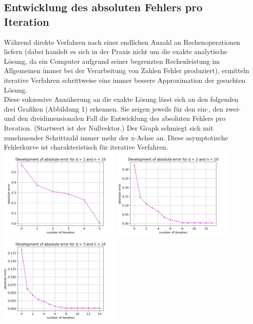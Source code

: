 \documentclass{scrartcl}
\begin{document}
\subsection{Entwicklung des absoluten Fehlers pro Iteration}
Während direkte Verfahren nach einer endlichen Anzahl an Rechenoperationen \grqq{} liefern (dabei handelt es sich in der Praxis nicht um die exakte analytische Lösung, da ein Computer aufgrund seiner begrenzten Rechenleistung im Allgemeinen immer bei der Verarbeitung von Zahlen Fehler produziert), ermitteln iterative Verfahren schrittweise eine immer bessere Approximation der gesuchten Lösung. \\
Diese sukzessive Annäherung an die exakte Lösung lässt sich an den folgenden drei Grafiken (Abbildung 1) erkennen.
Sie zeigen jeweils für den ein-, den zwei- und den dreidimensionalen Fall die Entwicklung des absoluten Fehlers pro Iteration.
(Startwert ist der Nullvektor.)
Der Graph schmiegt sich mit zunehmender Schrittzahl immer mehr der x-Achse an.
Diese asymptotische Fehlerkurve ist charakteristisch für iterative Verfahren. \\

{
  \centering
    \includegraphics[width=0.45\textwidth]{Grafiken/iterates_d1_n10}
    \includegraphics[width=0.45\textwidth]{Grafiken/iterates_d2_n10}
    \includegraphics[width=0.45\textwidth]{Grafiken/iterates_d3_n10}
    \vspace{-0.2cm}
}
\vspace{0.5cm}
\end{document}
